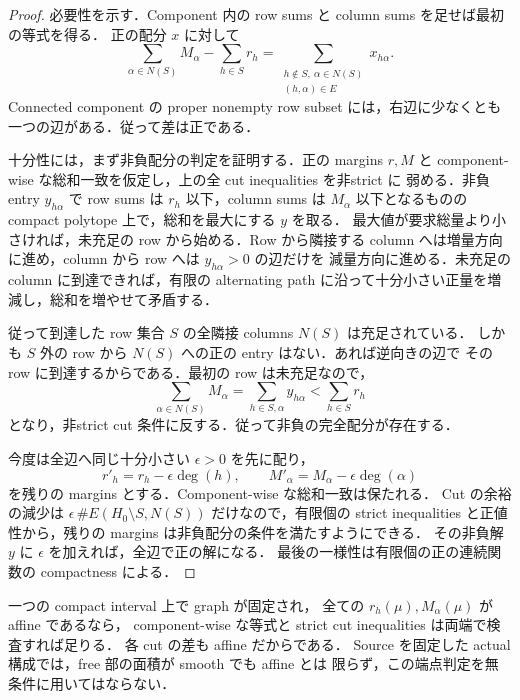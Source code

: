 \begin{proof}
必要性を示す．Component 内の row sums と column sums を足せば最初の等式を得る．
正の配分 $x$ に対して
\[
 \sum_{\alpha\in N(S)}M_\alpha-\sum_{h\in S}r_h
 =\sum_{\substack{h\notin S,\ \alpha\in N(S)\\(h,\alpha)\in E}}x_{h\alpha}.
\]
Connected component の proper nonempty row subset には，右辺に少なくとも
一つの辺がある．従って差は正である．

十分性には，まず非負配分の判定を証明する．正の margins $r,M$ と
component-wise な総和一致を仮定し，上の全 cut inequalities を非strict に
弱める．非負 entry $y_{h\alpha}$ で row sums は $r_h$ 以下，column sums は
$M_\alpha$ 以下となるものの compact polytope 上で，総和を最大にする $y$ を取る．
最大値が要求総量より小さければ，未充足の row から始める．Row から隣接する
column へは増量方向に進め，column から row へは $y_{h\alpha}>0$ の辺だけを
減量方向に進める．未充足の column に到達できれば，有限の alternating path
に沿って十分小さい正量を増減し，総和を増やせて矛盾する．

従って到達した row 集合 $S$ の全隣接 columns $N(S)$ は充足されている．
しかも $S$ 外の row から $N(S)$ への正の entry はない．あれば逆向きの辺で
その row に到達するからである．最初の row は未充足なので，
\[
 \sum_{\alpha\in N(S)}M_\alpha
 =\sum_{h\in S,\alpha}y_{h\alpha}
 <\sum_{h\in S}r_h
\]
となり，非strict cut 条件に反する．従って非負の完全配分が存在する．

今度は全辺へ同じ十分小さい $\epsilon>0$ を先に配り，
\[
 r'_h=r_h-\epsilon\deg(h),\qquad
 M'_\alpha=M_\alpha-\epsilon\deg(\alpha)
\]
を残りの margins とする．Component-wise な総和一致は保たれる．
Cut の余裕の減少は
$\epsilon\,\#E(H_0\setminus S,N(S))$ だけなので，有限個の strict inequalities
と正値性から，残りの margins は非負配分の条件を満たすようにできる．
その非負解 $y$ に $\epsilon$ を加えれば，全辺で正の解になる．
最後の一様性は有限個の正の連続関数の compactness による．
\end{proof}

\begin{remark}[端だけの検査で足りる場合]
\label{ng8:affine-area-cuts}
一つの compact interval 上で graph が固定され，
全ての $r_h(\mu),M_\alpha(\mu)$ が affine であるなら，
component-wise な等式と strict cut inequalities は両端で検査すれば足りる．
各 cut の差も affine だからである．
Source を固定した actual 構成では，free 部の面積が smooth でも affine とは
限らず，この端点判定を無条件に用いてはならない．
\end{remark}

